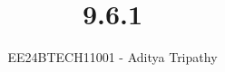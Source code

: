 \documentclass[journal]{IEEEtran}
\begin{document}

\vspace{3cm}

\title{9.6.1}
\author{EE24BTECH11001 - Aditya Tripathy}
 \maketitle
{\let\newpage\relax\maketitle}

\renewcommand{\thefigure}{\theenumi}
\renewcommand{\thetable}{\theenumi}
\setlength{\intextsep}{10pt} %


\renewcommand{\thetable}{\theenumi}
\end{document}
